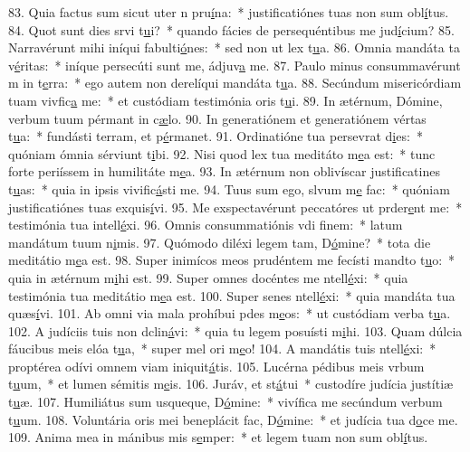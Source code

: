 83. Quia factus sum sicut uter n pru\uline{í}na:~* justificatiónes tuas non sum obl\uline{í}tus.
84. Quot sunt dies srvi t\uline{u}i?~* quando fácies de persequéntibus me jud\uline{í}cium?
85. Narravérunt mihi iníqui fabulti\uline{ó}nes:~* sed non ut lex t\uline{u}a.
86. Omnia mandáta ta v\uline{é}ritas:~* iníque persecúti sunt me, ádjuv\uline{a} me.
87. Paulo minus consummavérunt m in t\uline{e}rra:~* ego autem non derelíqui mandáta t\uline{u}a.
88. Secúndum misericórdiam tuam vivfic\uline{a} me:~* et custódiam testimónia oris t\uline{u}i.
89. In ætérnum, Dómine, verbum tuum pérmant in c\uline{æ}lo.
90. In generatiónem et generatiónem vértas t\uline{u}a:~* fundásti terram, et p\uline{é}rmanet.
91. Ordinatióne tua persevrat d\uline{i}es:~* quóniam ómnia sérviunt t\uline{i}bi.
92. Nisi quod lex tua meditáto m\uline{e}a est:~* tunc forte periíssem in humilitáte m\uline{e}a.
93. In ætérnum non oblivíscar justificatines t\uline{u}as:~* quia in ipsis vivific\uline{á}sti me.
94. Tuus sum ego, slvum m\uline{e} fac:~* quóniam justificatiónes tuas exquis\uline{í}vi.
95. Me exspectavérunt peccatóres ut prder\uline{e}nt me:~* testimónia tua intell\uline{é}xi.
96. Omnis consummatiónis vdi f\uline{i}nem:~* latum mandátum tuum n\uline{i}mis.
97. Quómodo diléxi legem tam, D\uline{ó}mine?~* tota die meditátio m\uline{e}a est.
98. Super inimícos meos prudéntem me fecísti mandto t\uline{u}o:~* quia in ætérnum m\uline{i}hi est.
99. Super omnes docéntes me ntell\uline{é}xi:~* quia testimónia tua meditátio m\uline{e}a est.
100. Super senes ntell\uline{é}xi:~* quia mandáta tua quæs\uline{í}vi.
101. Ab omni via mala prohíbui pdes m\uline{e}os:~* ut custódiam verba t\uline{u}a.
102. A judíciis tuis non dclin\uline{á}vi:~* quia tu legem posuísti m\uline{i}hi.
103. Quam dúlcia fáucibus meis elóa t\uline{u}a,~* super mel ori m\uline{e}o!
104. A mandátis tuis ntell\uline{é}xi:~* proptérea odívi omnem viam iniquit\uline{á}tis.
105. Lucérna pédibus meis vrbum t\uline{u}um,~* et lumen sémitis m\uline{e}is.
106. Juráv, et st\uline{á}tui~* custodíre judícia justítiæ t\uline{u}æ.
107. Humiliátus sum usqueque, D\uline{ó}mine:~* vivífica me secúndum verbum t\uline{u}um.
108. Voluntária oris mei beneplácit fac, D\uline{ó}mine:~* et judícia tua d\uline{o}ce me.
109. Anima mea in mánibus mis s\uline{e}mper:~* et legem tuam non sum obl\uline{í}tus.
